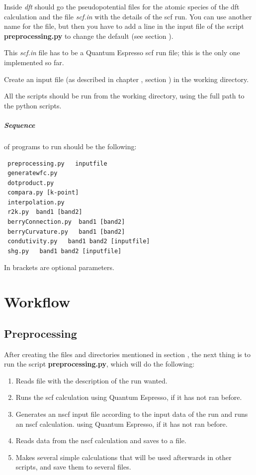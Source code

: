 \documentclass[a4paper,12pt]{report}
\begin{document}
 Inside \emph{dft} should go the pseudopotential files for the atomic species of the dft calculation
and the file \emph{scf.in} with the details of the scf run.
You can use another name for the file, but then you have to add a line in the input file of
the script \textbf{preprocessing.py} to change the default (see section ).

 This \emph{scf.in} file has to be a {\sc Quantum Espresso} scf run file;
 this is the only one implemented so far.

 Create an input file (as described in chapter , section )
 in the working directory.

 All the scripts should be run from the working directory, using the full path to the python scripts.

\paragraph{Sequence} of programs to run should be the following:
\begin{verbatim}
 preprocessing.py   inputfile
 generatewfc.py
 dotproduct.py
 compara.py [k-point]
 interpolation.py
 r2k.py  band1 [band2]
 berryConnection.py  band1 [band2]
 berryCurvature.py   band1 [band2]
 condutivity.py   band1 band2 [inputfile]
 shg.py   band1 band2 [inputfile]
\end{verbatim}
In brackets are optional parameters.




\chapter{Workflow}\label{ch:workflow}

\section{Preprocessing}\label{sec:preprocessing}
 After creating the files and directories mentioned in section , the next thing is
 to run the script \textbf{preprocessing.py}, which will do the following:
 \begin{enumerate}
  \item Reads file with the description of the run wanted.
  \item Runs the scf calculation using {\sc Quantum Espresso}, if it has not ran before.
  \item Generates an nscf input file according to the input data of the run and runs an nscf calculation.
  using {\sc Quantum Espresso}, if it has not ran before.
  \item Reads data from the nscf calculation and saves to a file.
  \item Makes several simple calculations that will be used afterwards in other scripts, and save them to several files.
 \end{enumerate}
\end{document}

